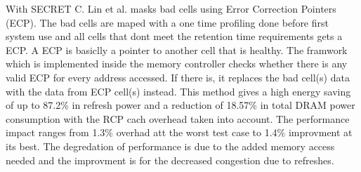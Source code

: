 With SECRET C. Lin et al. \cite{secret} masks bad cells using Error Correction Pointers (ECP). The bad cells are maped with a one time profiling done before first system use and all cells that dont meet the retention time requirements gets a ECP. A ECP is basiclly a pointer to another cell that is healthy. The framwork which is implemented inside the memory controller checks whether there is any valid ECP for every address accessed. If there is, it replaces the bad cell(s) data with the data from ECP cell(s) instead.
This method gives a high energy saving of up to 87.2\% in refresh power and a reduction of 18.57\% in total DRAM power consumption with the RCP cach overhead taken into account.
The performance impact ranges from 1.3\% overhad att the worst test case to 1.4\% improvment at its best. The degredation of performance is due to the added memory access needed and the improvment is for the decreased congestion due to refreshes.